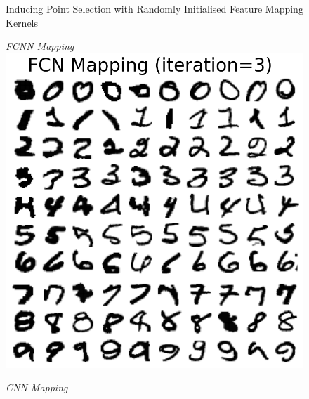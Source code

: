 \documentclass{article}
\numberwithin{equation}{section}
\begin{document}
\begin{figure}[h!]
\begin{minipage}{.25\textwidth}
\end{minipage}%
\caption{Inducing Point Selection with Randomly Initialised Feature Mapping Kernels}\label{fig:mnist-nn-mapping-kernels-0}
\end{figure}

\begin{figure}[h!]
\small
\centering
\begin{minipage}{.25\textwidth}
  \centering
  \textit{FCNN Mapping}
  \includegraphics[width=\linewidth, trim={0 0 0 1.5cm},clip]{thesis_report/figures/custom_mapping/fcn/iteration_3.png}
\end{minipage}%
\begin{minipage}{.25\textwidth}
  \centering
  \textit{CNN Mapping}

\end{minipage}
\end{figure}
\end{document}
